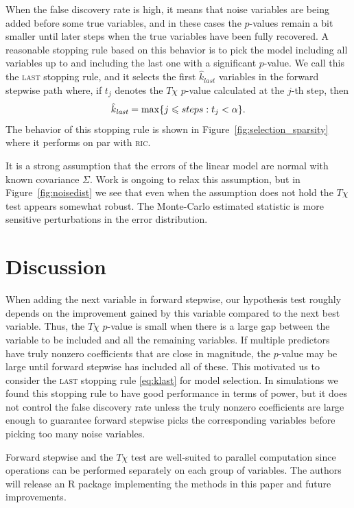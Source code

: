\documentclass[oupdraft]{bio}
\def\ric{\textsc{ric}\xspace}
\def\last{\textsc{last}\xspace}
\begin{document}
When the false discovery rate is high, it means that noise variables are being added before some true variables, and in these cases the $p$-values remain a bit smaller until later steps when the true variables have been fully recovered.
A reasonable stopping rule based
on this behavior is to pick the model including all variables up to and
including the last one with a significant $p$-value. We call this the
\last stopping rule, and it selects the first $\hat k_\textit{last}$
variables in the forward stepwise path where, if
$t_j$ denotes the $T\chi$ $p$-value calculated at the $j$-th step, then
\begin{equation}
  \label{eq:klast}
    \hat k_\textit{last} = \max \{ j \leq steps : t_j < \alpha \}. \\
\end{equation}
The behavior of this stopping rule is shown in Figure~\ref{fig:selection_sparsity} where it performs on par with \ric.


It is a strong assumption that the errors of the linear model are normal with known covariance $\Sigma$. Work is ongoing to relax this assumption, but in Figure~\ref{fig:noisedist} we see that even when the assumption does not hold the $T\chi$ test appears somewhat robust. The Monte-Carlo estimated statistic is more sensitive perturbations in the error distribution.


\section{Discussion}


When adding the next variable in forward stepwise, our hypothesis test
roughly depends on the improvement gained by this variable compared to
the next best variable.
Thus, the $T\chi$ $p$-value is small when there is a large
gap between the variable to be included and all the remaining variables.
If multiple predictors have truly nonzero coefficients that are close
in magnitude, the $p$-value may be large until forward stepwise has
included all of these.
This motivated us to consider the \last stopping
rule \eqref{eq:klast} for model selection. In simulations we
found this stopping rule to have good performance in terms of power, 
but it does not control the false discovery rate
unless the truly nonzero coefficients are large enough to guarantee
forward stepwise picks the corresponding variables before picking too
many noise variables.

Forward stepwise and the $T\chi$ test 
are well-suited to parallel computation since operations can be performed
separately on each group of variables.
The authors will release an R
package implementing the methods in this paper and future improvements.
\end{document}
